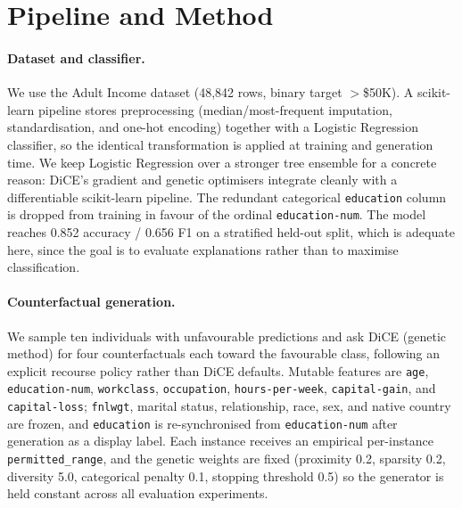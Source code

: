 \documentclass[letterpaper]{article}
\begin{document}
\section{Pipeline and Method}
\paragraph{Dataset and classifier.}
We use the Adult Income dataset (48{,}842 rows, binary target $>$\$50K). A scikit-learn pipeline stores preprocessing (median/most-frequent imputation, standardisation, and one-hot encoding) together with a Logistic Regression classifier, so the identical transformation is applied at training and generation time. We keep Logistic Regression over a stronger tree ensemble for a concrete reason: DiCE's gradient and genetic optimisers integrate cleanly with a differentiable scikit-learn pipeline. The redundant categorical \texttt{education} column is dropped from training in favour of the ordinal \texttt{education-num}. The model reaches 0.852 accuracy / 0.656 F1 on a stratified held-out split, which is adequate here, since the goal is to evaluate explanations rather than to maximise classification.

\paragraph{Counterfactual generation.}
We sample ten individuals with unfavourable predictions and ask DiCE (genetic method) for four counterfactuals each toward the favourable class, following an explicit recourse policy rather than DiCE defaults. Mutable features are \texttt{age}, \texttt{education-num}, \texttt{workclass}, \texttt{occupation}, \texttt{hours-per-week}, \texttt{capital-gain}, and \texttt{capital-loss}; \texttt{fnlwgt}, marital status, relationship, race, sex, and native country are frozen, and \texttt{education} is re-synchronised from \texttt{education-num} after generation as a display label. Each instance receives an empirical per-instance \texttt{permitted\_range}, and the genetic weights are fixed (proximity 0.2, sparsity 0.2, diversity 5.0, categorical penalty 0.1, stopping threshold 0.5) so the generator is held constant across all evaluation experiments.
\end{document}
